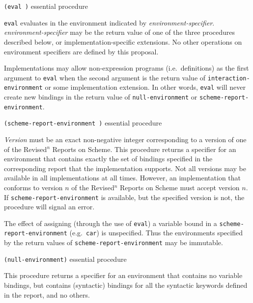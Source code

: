 \begin{list}{}{}{}\item

    {\tt(eval  )}
        \hfill {\rm essential procedure}

    {\tt eval} evaluates  in the environment indicated
    by {\em environment-\discretionary{}{}{}specifier}.  {\em
    environment-specifier} may be the return value of one of the three
    procedures described below, or implementation-specific extensions.
    No other operations on environment specifiers are defined by this
    proposal.

    Implementations may allow non-expression programs (i.e.\
    definitions) as the first argument to {\tt eval}  when
    the second argument is the return value of {\tt interaction-environment}
    or some implementation extension.  In other words, {\tt eval} will never
    create new bindings in the return value of {\tt null-environment} or
    {\tt scheme-report-environment}.

    \vspace{2ex}

    {\tt(scheme-report-environment )}
        \hfill {\rm essential procedure}

    {\em Version} must be an exact non-negative integer corresponding to a
    version of one of the Revised$^n$ Reports on Scheme.  This procedure
    returns a specifier for an environment that contains exactly the
    set of bindings specified in the corresponding report that the
    implementation supports.  Not all versions may be available in all
    implementations at all times.  However, an implementation that
    conforms to version $n$ of the Revised$^n$ Reports on Scheme must
    accept version $n$.  If {\tt scheme-report-environment} is
    available, but the specified version is not, the procedure will
    signal an error.

    The effect of assigning (through the use of {\tt eval}) a variable
    bound in a {\tt scheme-report-environment} (e.g.\ {\tt car}) is
    unspecified. Thus the environments specified by the return
    values of {\tt scheme-report-environment} may be immutable.

    \vspace{2ex}

    {\tt(null-environment)}
        \hfill {\rm essential procedure}

    This procedure returns a specifier for an environment that contains no
    variable bindings, but contains (syntactic) bindings for all the
    syntactic keywords defined in the report, and no others.


\end{list}
